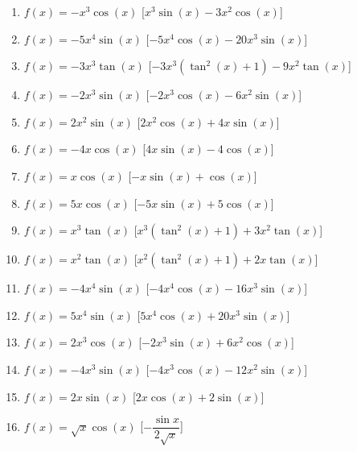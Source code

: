 \begin{enumerate}
\begin{enumerate}
\item \(f(x) = - x^{3} \cos{\left (x \right )}\) \hfill [\(x^{3} \sin{\left (x 
\right )} - 3 x^{2} \cos{\left (x \right )}\)]
\item \(f(x) = - 5 x^{4} \sin{\left (x \right )}\) \hfill [\(- 5 x^{4} 
\cos{\left (x \right )} - 20 x^{3} \sin{\left (x \right )}\)]
\item \(f(x) = - 3 x^{3} \tan{\left (x \right )}\) \hfill [\(- 3 x^{3} 
\left(\tan^{2}{\left (x \right )} + 1\right) - 9 x^{2} \tan{\left (x \right 
)}\)]
\item \(f(x) = - 2 x^{3} \sin{\left (x \right )}\) \hfill [\(- 2 x^{3} 
\cos{\left (x \right )} - 6 x^{2} \sin{\left (x \right )}\)]
\item \(f(x) = 2 x^{2} \sin{\left (x \right )}\) \hfill [\(2 x^{2} \cos{\left (x 
\right )} + 4 x \sin{\left (x \right )}\)]
\item \(f(x) = - 4 x \cos{\left (x \right )}\) \hfill [\(4 x \sin{\left (x 
\right )} - 4 \cos{\left (x \right )}\)]
\item \(f(x) = x \cos{\left (x \right )}\) \hfill [\(- x \sin{\left (x \right )} 
+ \cos{\left (x \right )}\)]
\item \(f(x) = 5 x \cos{\left (x \right )}\) \hfill [\(- 5 x \sin{\left (x 
\right )} + 5 \cos{\left (x \right )}\)]
\item \(f(x) = x^{3} \tan{\left (x \right )}\) \hfill [\(x^{3} 
\left(\tan^{2}{\left (x \right )} + 1\right) + 3 x^{2} \tan{\left (x \right 
)}\)]
\item \(f(x) = x^{2} \tan{\left (x \right )}\) \hfill [\(x^{2} 
\left(\tan^{2}{\left (x \right )} + 1\right) + 2 x \tan{\left (x \right )}\)]
\item \(f(x) = - 4 x^{4} \sin{\left (x \right )}\) \hfill [\(- 4 x^{4} 
\cos{\left (x \right )} - 16 x^{3} \sin{\left (x \right )}\)]
\item \(f(x) = 5 x^{4} \sin{\left (x \right )}\) \hfill [\(5 x^{4} \cos{\left (x 
\right )} + 20 x^{3} \sin{\left (x \right )}\)]
\item \(f(x) = 2 x^{3} \cos{\left (x \right )}\) \hfill [\(- 2 x^{3} \sin{\left 
(x \right )} + 6 x^{2} \cos{\left (x \right )}\)]
\item \(f(x) = - 4 x^{3} \sin{\left (x \right )}\) \hfill [\(- 4 x^{3} 
\cos{\left (x \right )} - 12 x^{2} \sin{\left (x \right )}\)]
\item \(f(x) = 2 x \sin{\left (x \right )}\) \hfill 
[\(2 x \cos{\left (x \right )} + 2 \sin{\left (x \right )}\)]
\item \(f(x) = \sqrt{x} \cos{\left (x \right )}\) \hfill 
[\(-\dfrac{\sin x}{2 \sqrt{x}}\)]
\end{enumerate}



\end{enumerate}
